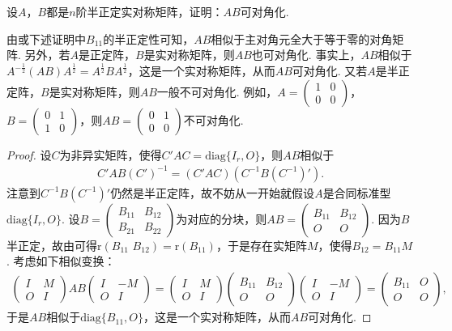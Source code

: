 \documentclass[../../main.tex]{subfiles}
\begin{document}
\begin{proposition}\label{proposition:例9.73}
设\(A\)，\(B\)都是\(n\)阶半正定实对称矩阵，证明：\(AB\)可对角化.
\end{proposition}
\begin{remark}
由或下述证明中\(B_{11}\)的半正定性可知，\(AB\)相似于主对角元全大于等于零的对角矩阵. 另外，若\(A\)是正定阵，\(B\)是实对称矩阵，则\(AB\)也可对角化. 事实上，\(AB\)相似于\(A^{-\frac{1}{2}}(AB)A^{\frac{1}{2}}=A^{\frac{1}{2}}BA^{\frac{1}{2}}\)，这是一个实对称矩阵，从而\(AB\)可对角化. 又若\(A\)是半正定阵，\(B\)是实对称矩阵，则\(AB\)一般不可对角化. 例如，\(A=\begin{pmatrix}1&0\\0&0\end{pmatrix}\)，\(B=\begin{pmatrix}0&1\\1&0\end{pmatrix}\)，则\(AB=\begin{pmatrix}0&1\\0&0\end{pmatrix}\)不可对角化. 
\end{remark}
\begin{proof}
设\(C\)为非异实矩阵，使得\(C'AC = \mathrm{diag}\{I_r,O\}\)，则\(AB\)相似于
\begin{align*}
C'AB(C')^{-1}=(C'AC)(C^{-1}B(C^{-1})').
\end{align*}
注意到\(C^{-1}B(C^{-1})'\)仍然是半正定阵，故不妨从一开始就假设\(A\)是合同标准型\(\mathrm{diag}\{I_r,O\}\). 设\(B=\begin{pmatrix}B_{11}&B_{12}\\B_{21}&B_{22}\end{pmatrix}\)为对应的分块，则\(AB=\begin{pmatrix}B_{11}&B_{12}\\O&O\end{pmatrix}\). 因为\(B\)半正定，故由可得\(\mathrm{r}(B_{11}\,\,B_{12})=\mathrm{r}(B_{11})\)，于是存在实矩阵\(M\)，使得\(B_{12}=B_{11}M\). 考虑如下相似变换：
\begin{align*}
\begin{pmatrix}I&M\\O&I\end{pmatrix}AB\begin{pmatrix}I&-M\\O&I\end{pmatrix}=\begin{pmatrix}I&M\\O&I\end{pmatrix}\begin{pmatrix}B_{11}&B_{12}\\O&O\end{pmatrix}\begin{pmatrix}I&-M\\O&I\end{pmatrix}=\begin{pmatrix}B_{11}&O\\O&O\end{pmatrix},
\end{align*}
于是\(AB\)相似于\(\mathrm{diag}\{B_{11},O\}\)，这是一个实对称矩阵，从而\(AB\)可对角化.
\end{proof}
\end{document}
